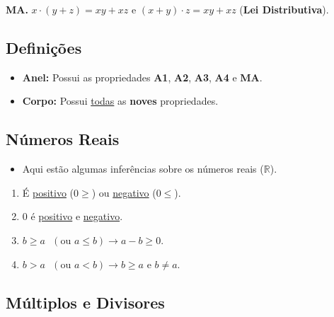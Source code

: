         \hspace{1cm}\textbf{MA.} $x \cdot (y + z) = xy + xz$ e $(x + y) \cdot z = xy + xz$ (\textbf{Lei Distributiva}).

        \hspace{2cm}

    \subsection{Definições}

        \begin{itemize}[left=0.5cm, align=left, nosep]
            \item \textbf{Anel:} Possui as propriedades \textbf{A1}, \textbf{A2}, \textbf{A3}, \textbf{A4} e \textbf{MA}.
            \item \textbf{Corpo:} Possui \underline{todas} as \textbf{noves} propriedades.
        \end{itemize}

    \subsection{Números Reais}

        \begin{itemize}[left=0.5cm, align=left, nosep]
            \item Aqui estão algumas inferências sobre os números reais ($\mathbb{R}$).
        \end{itemize} 

        \begin{enumerate}[left=1cm, align=left, nosep]
            \item É \underline{positivo} ($0 \geq $) ou \underline{negativo} ($0 \leq$).
            \item $0$ é \underline{positivo} e \underline{negativo}.
            \item $b \geq a \text{ }(\text{ou } a \leq b) \rightarrow a-b \geq 0$.
            \item $b > a \text{ }(\text{ou }  a < b) \rightarrow b \geq a \text{ e } b \ne a$.
        \end{enumerate}

    \subsection{Múltiplos e Divisores}

